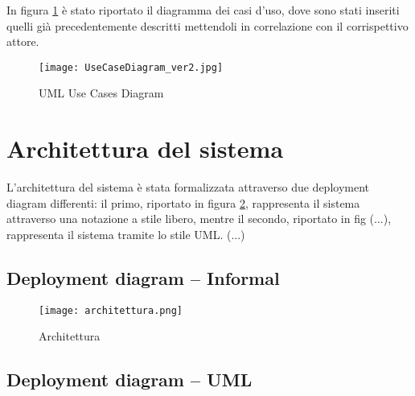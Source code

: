 In figura \ref{fig-uml-use-cases} è stato riportato il diagramma dei casi d'uso, dove sono stati inseriti quelli
già precedentemente descritti mettendoli in correlazione con il corrispettivo attore.

\begin{figure}[H]
      \centering
      \texttt{[image: UseCaseDiagram\_ver2.jpg]}
      \caption{UML Use Cases Diagram}
      \label{fig-uml-use-cases}
\end{figure}


\newpage
\section{Architettura del sistema}
L'architettura del sistema è stata formalizzata attraverso due deployment diagram differenti: 
il primo, riportato in figura \ref{architettura}, rappresenta il sistema
attraverso una notazione a stile libero, mentre il secondo, riportato in fig (...), rappresenta
il sistema tramite lo stile UML. (...)

\subsection{Deployment diagram -- Informal}
\begin{figure}[H]
      \centering
      \texttt{[image: architettura.png]}
      \caption{Architettura}
      \label{architettura}
\end{figure}



\subsection{Deployment diagram -- UML}
\begin{figure}[H]
\end{figure}




